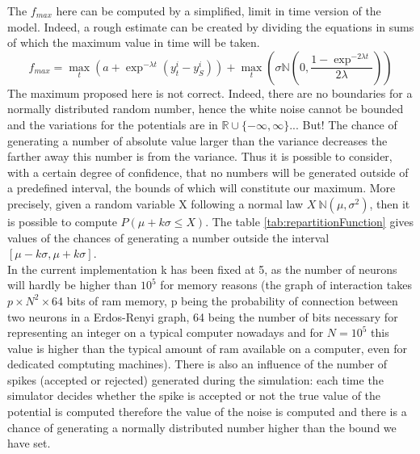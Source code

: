	The $f_{max}$ here can be computed by a simplified, limit in time version of the model. Indeed, a rough estimate can be created by dividing the equations in sums of which the maximum value in time will be taken.
	\[
		f_{max}=\max_t(a+\exp^{-\lambda t}(y_t^i-y_S^i))+\max_t(\sigma\mathbb{N}(0,\frac{1-\exp^{-2\lambda t}}{2\lambda}))
	\]
	The maximum proposed here is not correct. Indeed, there are no boundaries for a normally distributed random number, hence the white noise cannot be bounded and the variations for the potentials are in $\mathbb{R}\cup\{-\infty,\infty\}$... But! The chance of generating a number of absolute value larger than the variance decreases the farther away this number is from the variance. Thus it is possible to consider, with a certain degree of confidence, that no numbers will be generated outside of a predefined interval, the bounds of which will constitute our maximum. More precisely, given a random variable X following a normal law $X~\mathbb{N}(\mu,\sigma^2)$, then it is possible to compute $P(\mu+k\sigma\leq X)$. The table \hyperref[repartitionFunction]{\ref{tab:repartitionFunction}} gives values of the chances of generating a number outside the interval $[\mu-k\sigma,\mu+k\sigma]$.\\
	In the current implementation k has been fixed at 5, as the number of neurons will hardly be higher than $10^5$ for memory reasons (the graph of interaction takes $p\times N^2\times 64$ bits of ram memory, p being the probability of connection between two neurons in a Erdos-Renyi graph, 64 being the number of bits necessary for representing an integer on a typical computer nowadays and for $N=10^5$ this value is higher than the typical amount of ram available on a computer, even for dedicated comptuting machines). There is also an influence of the number of spikes (accepted or rejected) generated during the simulation: each time the simulator decides whether the spike is accepted or not the true value of the potential is computed therefore the value of the noise is computed and there is a chance of generating a normally distributed number higher than the bound we have set.\\

